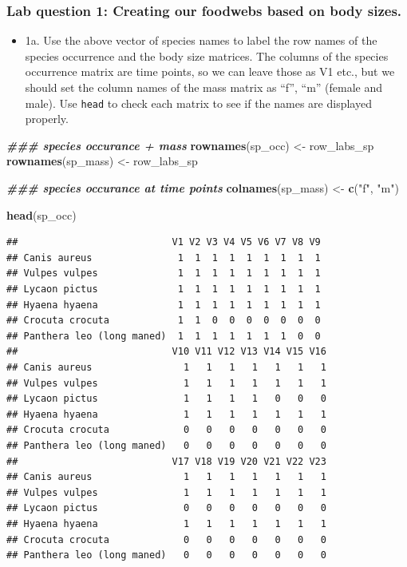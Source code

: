 \documentclass[
]{article}
\newenvironment{Shaded}{\begin{snugshade}}{\end{snugshade}}
\newcommand{\DocumentationTok}[1]{\textcolor[rgb]{0.56,0.35,0.01}{\textbf{\textit{#1}}}}
\newcommand{\FunctionTok}[1]{\textcolor[rgb]{0.13,0.29,0.53}{\textbf{#1}}}
\newcommand{\NormalTok}[1]{#1}
\newcommand{\OtherTok}[1]{\textcolor[rgb]{0.56,0.35,0.01}{#1}}
\newcommand{\StringTok}[1]{\textcolor[rgb]{0.31,0.60,0.02}{#1}}
\providecommand{\tightlist}{%
  \setlength{\itemsep}{0pt}\setlength{\parskip}{0pt}}
\begin{document}
\subsubsection{Lab question 1: Creating our foodwebs based on body
sizes.}\label{lab-question-1-creating-our-foodwebs-based-on-body-sizes.}

\begin{itemize}
\tightlist
\item
  1a. Use the above vector of species names to label the row names of
  the species occurrence and the body size matrices. The columns of the
  species occurrence matrix are time points, so we can leave those as V1
  etc., but we should set the column names of the mass matrix as ``f'',
  ``m'' (female and male). Use \texttt{head} to check each matrix to see
  if the names are displayed properly.
\end{itemize}

\begin{Shaded}
\begin{Highlighting}[]
\DocumentationTok{\#\#\#  species occurance + mass}
\FunctionTok{rownames}\NormalTok{(sp\_occ) }\OtherTok{\textless{}{-}}\NormalTok{ row\_labs\_sp}
\FunctionTok{rownames}\NormalTok{(sp\_mass) }\OtherTok{\textless{}{-}}\NormalTok{ row\_labs\_sp}

\DocumentationTok{\#\#\# species occurance at time points}
\FunctionTok{colnames}\NormalTok{(sp\_mass) }\OtherTok{\textless{}{-}} \FunctionTok{c}\NormalTok{(}\StringTok{"f"}\NormalTok{, }\StringTok{"m"}\NormalTok{)}

\FunctionTok{head}\NormalTok{(sp\_occ)}
\end{Highlighting}
\end{Shaded}

\begin{verbatim}
##                           V1 V2 V3 V4 V5 V6 V7 V8 V9
## Canis aureus               1  1  1  1  1  1  1  1  1
## Vulpes vulpes              1  1  1  1  1  1  1  1  1
## Lycaon pictus              1  1  1  1  1  1  1  1  1
## Hyaena hyaena              1  1  1  1  1  1  1  1  1
## Crocuta crocuta            1  1  0  0  0  0  0  0  0
## Panthera leo (long maned)  1  1  1  1  1  1  1  0  0
##                           V10 V11 V12 V13 V14 V15 V16
## Canis aureus                1   1   1   1   1   1   1
## Vulpes vulpes               1   1   1   1   1   1   1
## Lycaon pictus               1   1   1   1   0   0   0
## Hyaena hyaena               1   1   1   1   1   1   1
## Crocuta crocuta             0   0   0   0   0   0   0
## Panthera leo (long maned)   0   0   0   0   0   0   0
##                           V17 V18 V19 V20 V21 V22 V23
## Canis aureus                1   1   1   1   1   1   1
## Vulpes vulpes               1   1   1   1   1   1   1
## Lycaon pictus               0   0   0   0   0   0   0
## Hyaena hyaena               1   1   1   1   1   1   1
## Crocuta crocuta             0   0   0   0   0   0   0
## Panthera leo (long maned)   0   0   0   0   0   0   0
\end{verbatim}
\end{document}
